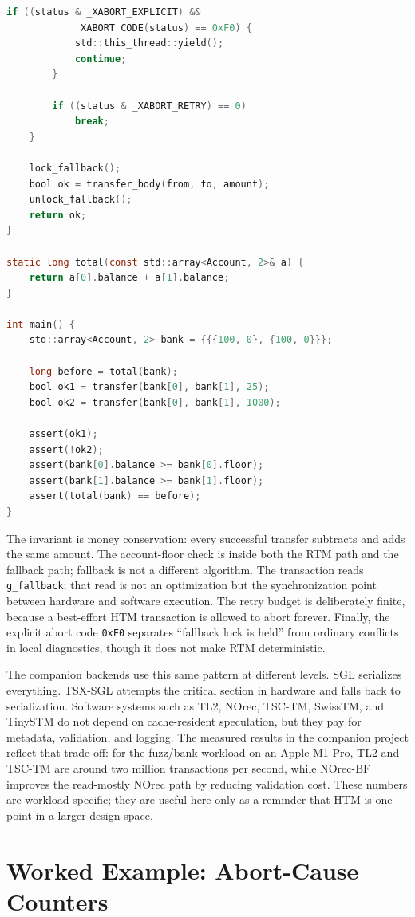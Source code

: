 \begin{lstlisting}[language=C, caption={A compilable RTM bank transfer with account floors and fallback lock subscription.}, label={lst:rtm-bank-transfer}]
        if ((status & _XABORT_EXPLICIT) &&
            _XABORT_CODE(status) == 0xF0) {
            std::this_thread::yield();
            continue;
        }

        if ((status & _XABORT_RETRY) == 0)
            break;
    }

    lock_fallback();
    bool ok = transfer_body(from, to, amount);
    unlock_fallback();
    return ok;
}

static long total(const std::array<Account, 2>& a) {
    return a[0].balance + a[1].balance;
}

int main() {
    std::array<Account, 2> bank = {{{100, 0}, {100, 0}}};

    long before = total(bank);
    bool ok1 = transfer(bank[0], bank[1], 25);
    bool ok2 = transfer(bank[0], bank[1], 1000);

    assert(ok1);
    assert(!ok2);
    assert(bank[0].balance >= bank[0].floor);
    assert(bank[1].balance >= bank[1].floor);
    assert(total(bank) == before);
}
\end{lstlisting}

The invariant is money conservation: every successful transfer subtracts and adds the same amount. The account-floor check is inside both the RTM path and the fallback path; fallback is not a different algorithm. The transaction reads \texttt{g\_fallback}; that read is not an optimization but the synchronization point between hardware and software execution. The retry budget is deliberately finite, because a best-effort HTM transaction is allowed to abort forever. Finally, the explicit abort code \texttt{0xF0} separates ``fallback lock is held'' from ordinary conflicts in local diagnostics, though it does not make RTM deterministic.

The companion backends use this same pattern at different levels. SGL serializes everything. TSX-SGL attempts the critical section in hardware and falls back to serialization. Software systems such as TL2, NOrec, TSC-TM, SwissTM, and TinySTM do not depend on cache-resident speculation, but they pay for metadata, validation, and logging. The measured results in the companion project reflect that trade-off: for the fuzz/bank workload on an Apple M1 Pro, TL2 and TSC-TM are around two million transactions per second, while NOrec-BF improves the read-mostly NOrec path by reducing validation cost. These numbers are workload-specific; they are useful here only as a reminder that HTM is one point in a larger design space.

\section{Worked Example: Abort-Cause Counters}
\label{sec:htm-abort-counters}

